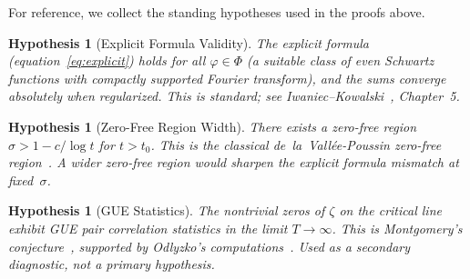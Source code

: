 \documentclass[11pt]{article}
\newtheorem{hypothesis}[theorem]{Hypothesis}
\theoremstyle{remark}
\begin{document}
For reference, we collect the standing hypotheses used in the proofs above.

\begin{hypothesis}[Explicit Formula Validity]
\label{hyp:explicit}
The explicit formula (equation~\eqref{eq:explicit}) holds for all
$\varphi\in\Phi$ (a suitable class of even Schwartz functions with compactly
supported Fourier transform), and the sums converge absolutely when regularized.
This is standard; see Iwaniec--Kowalski~\cite{IK}, Chapter~5.
\end{hypothesis}

\begin{hypothesis}[Zero-Free Region Width]
\label{hyp:zerofree}
There exists a zero-free region $\sigma>1-c/\log t$ for $t>t_0$.
This is the classical de~la~Vall\'ee-Poussin zero-free region~\cite{dlVP}.
A wider zero-free region would sharpen the explicit formula mismatch at fixed~$\sigma$.
\end{hypothesis}

\begin{hypothesis}[GUE Statistics]
\label{hyp:GUE}
The nontrivial zeros of $\zeta$ on the critical line exhibit GUE pair correlation
statistics in the limit $T\to\infty$.
This is Montgomery's conjecture~\cite{Mont}, supported by Odlyzko's
computations~\cite{Odl}.
Used as a secondary diagnostic, not a primary hypothesis.
\end{hypothesis}
\end{document}
